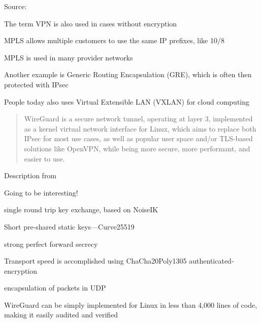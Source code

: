\documentclass[Screen16to9,17pt]{foils}
\begin{document}
Source:\\
{\footnotesize{}}

\begin{list2}
\item The term VPN is also used in cases without encryption
\item MPLS allows multiple customers to use the same IP prefixes, like 10/8
\item MPLS is used in many provider networks
\item Another example is Generic Routing Encapsulation (GRE), which is often then protected with IPsec
\item People today also uses Virtual Extensible LAN (VXLAN) for cloud computing
\end{list2}




\begin{quote}\small
WireGuard is a secure network tunnel, operating at layer 3, implemented as a kernel virtual network interface for Linux, which aims to replace both IPsec for most use cases, as well as popular user space and/or TLS-based solutions like OpenVPN, while being more secure, more performant, and easier to use.
\end{quote}

Description from 

\begin{list2}
\item Going to be interesting!
\item single round trip key exchange, based on NoiseIK
\item Short pre-shared static keys—Curve25519
\item strong perfect forward secrecy
\item Transport
speed is accomplished using ChaCha20Poly1305 authenticated-encryption
\item encapsulation of packets in UDP
\item WireGuard can be
simply implemented for Linux in less than 4,000 lines of code, making it easily audited and verified
\end{list2}



\end{document}
